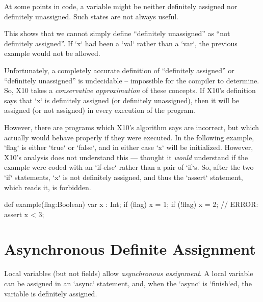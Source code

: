 At some points in code, a variable might be neither definitely assigned nor
definitely unassigned.    Such states are not always useful.  
% 
\begin{xten}
def example(flag : Boolean) {
  var x : Int;
  if (flag) x = 1;
  // x is neither def. assigned nor unassigned.
  x = 2; 
  // x is def. assigned.
\end{xten}
This shows that we cannot simply define ``definitely unassigned'' as ``not
definitely assigned''.   If \xcd`x` had been a \xcd`val` rather than a
\xcd`var`, the previous example would not be allowed.    

Unfortunately, a completely accurate definition of ``definitely assigned''
or ``definitely unassigned'' is undecidable -- impossible for the compiler to
determine.  So, X10 takes a {\em conservative approximation} of these
concepts.  If X10's definition says that \xcd`x` is definitely assigned (or
definitely unassigned), then it will be assigned (or not assigned) in every
execution of the program.  

However, there are programs which X10's algorithm says are incorrect, but
which actually would behave properly if they were executed.   In the following
example, \xcd`flag` is either \xcd`true` or \xcd`false`, and in either case
\xcd`x` will be initialized.  However, X10's analysis does not understand this
--- thought it {\em would} understand if the example were coded with an
\xcd`if-else` rather than a pair of \xcd`if`s.  So, after the two \xcd`if`
statements, \xcd`x` is not definitely assigned, and thus the \xcd`assert`
statement, which reads it, is forbidden.  
\begin{xten}
def example(flag:Boolean) {
  var x : Int;
  if (flag) x = 1;
  if (!flag) x = 2;
  // ERROR: assert x < 3;
}
\end{xten}

\section{Asynchronous Definite Assignment}


Local variables (but not fields) allow {\em asynchronous assignment}. A local
variable can be assigned in an \xcd`async` statement, and, when the
\xcd`async` is \xcd`finish`ed, the variable is definitely assigned.  

